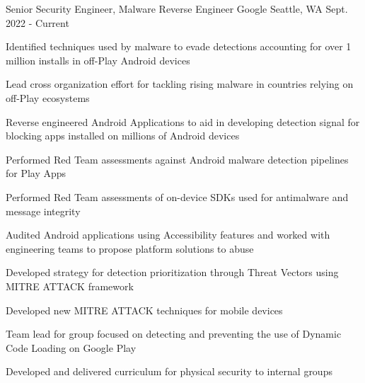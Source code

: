 \begin{cventries}
\cventry
{Senior Security Engineer, Malware Reverse Engineer} %
{Google}
{Seattle, WA}
{Sept. 2022 - Current}
{
    \begin{cvitems}
        \item {Identified techniques used by malware to evade detections accounting for over 1 million installs in off-Play Android devices}
        \item {Lead cross organization effort for tackling rising malware in countries relying on off-Play ecosystems}
        \item {Reverse engineered Android Applications to aid in developing detection signal for blocking apps installed on millions of Android devices}
        \item {Performed Red Team assessments against Android malware detection pipelines for Play Apps}
        \item {Performed Red Team assessments of on-device SDKs used for antimalware and message integrity}
        \item {Audited Android applications using Accessibility features and worked with engineering teams to propose platform solutions to abuse}
        \item {Developed strategy for detection prioritization through Threat Vectors using MITRE ATTACK framework}
        \item {Developed new MITRE ATTACK techniques for mobile devices}
        \item {Team lead for group focused on detecting and preventing the use of Dynamic Code Loading on Google Play}
        \item {Developed and delivered curriculum for physical security to internal groups}
    \end{cvitems}
}



\end{cventries}
